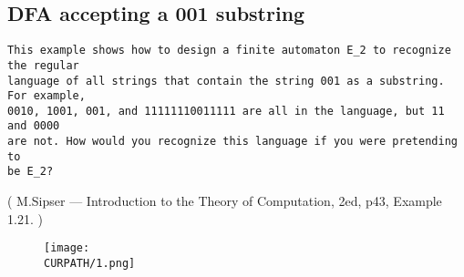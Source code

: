 \subsection{DFA accepting a 001 substring}

\renewcommand{\CURPATH}{synth/DFA}

\begin{lstlisting}
This example shows how to design a finite automaton E_2 to recognize the regular
language of all strings that contain the string 001 as a substring. For example,
0010, 1001, 001, and 11111110011111 are all in the language, but 11 and 0000
are not. How would you recognize this language if you were pretending to
be E_2?
\end{lstlisting}
( M.Sipser --- Introduction to the Theory of Computation, 2ed, p43, Example 1.21. )



\begin{figure}[H]
\centering
\texttt{[image: \\CURPATH/1.png]}
\end{figure}

